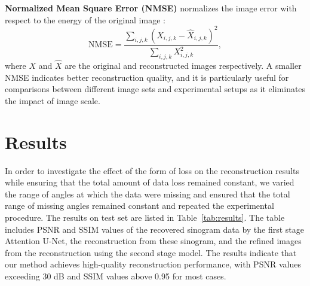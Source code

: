\documentclass[12pt]{iopart}
\begin{document}
\textbf{Normalized Mean Square Error (NMSE)} normalizes the image error with respect to the energy of the original image \cite{Higashiyama2024NMSE}:
\begin{equation}
\text{NMSE} = \frac{\sum_{i,j,k}(X_{i,j,k} - \hat{X}_{i,j,k})^2}{\sum_{i,j,k}X_{i,j,k}^2},
\end{equation}
where $X$ and $\hat{X}$ are the original and reconstructed images respectively. A smaller NMSE indicates better reconstruction quality, and it is particularly useful for comparisons between different image sets and experimental setups as it eliminates the impact of image scale.




\section{Results}
\label{chap:results}
In order to investigate the effect of the form of loss on the reconstruction results while ensuring that the total amount of data loss remained constant, we varied the range of angles at which the data were missing and ensured that the total range of missing angles remained constant and repeated the experimental procedure. The results on test set are listed in Table~\ref{tab:results}. 
The table includes PSNR and SSIM values of the recovered sinogram data by the first stage Attention U-Net, the reconstruction from these sinogram, and the refined images from the reconstruction using the second stage model. The results indicate that our method achieves high-quality reconstruction performance, with PSNR values exceeding 30 dB and SSIM values above 0.95 for most cases. 
\end{document}
